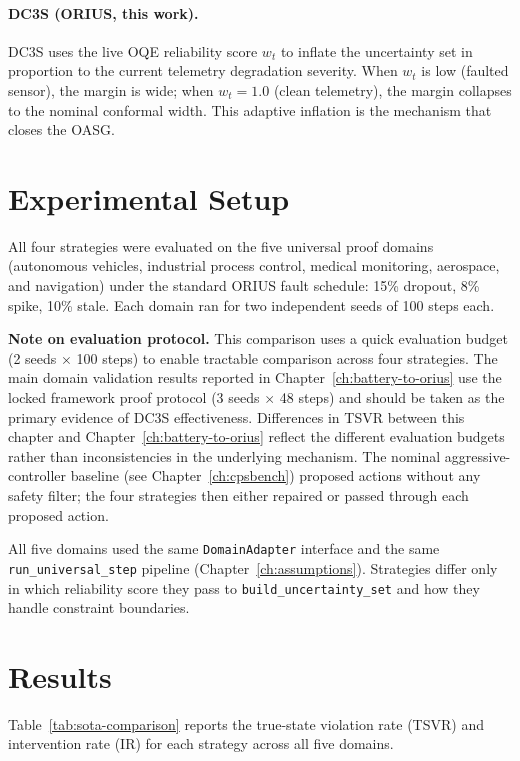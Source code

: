 \paragraph{DC3S (ORIUS, this work).}
DC3S uses the live OQE reliability score $w_t$ to inflate the uncertainty
set in proportion to the current telemetry degradation severity.  When
$w_t$ is low (faulted sensor), the margin is wide; when $w_t = 1.0$ (clean
telemetry), the margin collapses to the nominal conformal width.  This
adaptive inflation is the mechanism that closes the OASG.

\section{Experimental Setup}

All four strategies were evaluated on the five universal proof domains
(autonomous vehicles, industrial process control, medical monitoring,
aerospace, and navigation) under the standard ORIUS fault schedule: 15\%
dropout, 8\% spike, 10\% stale.  Each domain ran for two independent seeds
of 100 steps each.

\textbf{Note on evaluation protocol.}  This comparison uses a quick
evaluation budget (2 seeds $\times$ 100 steps) to enable tractable
comparison across four strategies.  The main domain validation results
reported in Chapter~\ref{ch:battery-to-orius} use the locked framework
proof protocol (3 seeds $\times$ 48 steps) and should be taken as the
primary evidence of DC3S effectiveness.  Differences in TSVR between
this chapter and Chapter~\ref{ch:battery-to-orius} reflect the different
evaluation budgets rather than inconsistencies in the underlying mechanism.  The nominal aggressive-controller baseline (see
Chapter~\ref{ch:cpsbench}) proposed actions without any safety
filter; the four strategies then either repaired or passed through each
proposed action.

All five domains used the same \texttt{DomainAdapter} interface and the same
\texttt{run\_universal\_step} pipeline (Chapter~\ref{ch:assumptions}).
Strategies differ only in which reliability score they pass to
\texttt{build\_uncertainty\_set} and how they handle constraint boundaries.

\section{Results}

Table~\ref{tab:sota-comparison} reports the true-state violation rate (TSVR)
and intervention rate (IR) for each strategy across all five domains.

